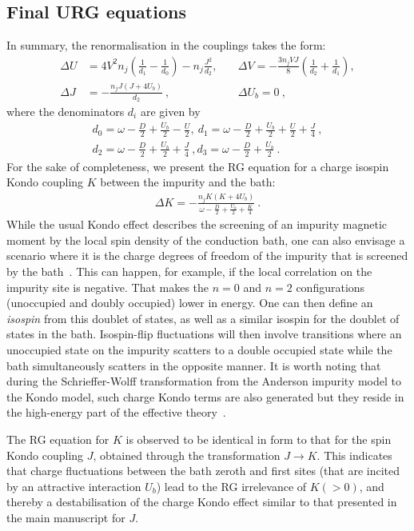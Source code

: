 \subsection{Final URG equations}
In summary, the renormalisation in the couplings takes the form:
\begin{eqnarray}
	\Delta U &= 4V^2 n_j\left(\frac{1}{d_1} - \frac{1}{d_0}\right) - n_j\frac{J^2}{d_2},\quad &\Delta V = -\frac{3n_j VJ}{8}\left(\frac{1}{d_2} + \frac{1}{d_1}\right),\nonumber \\
	\Delta J &= -\frac{n_j J\left(J + 4U_b\right)}{d_2}~,\quad &\Delta U_b = 0~,
\end{eqnarray}
where the denominators \(d_i\) are given by
\begin{eqnarray}
	d_0 = \omega - \frac{D}{2} + \frac{U_b}{2} - \frac{U}{2},~d_1 = \omega - \frac{D}{2} + \frac{U_b}{2} + \frac{U}{2} + \frac{J}{4}~,\\
	d_2 = \omega - \frac{D}{2} + \frac{U_b}{2} + \frac{J}{4}~,d_3 = \omega - \frac{D}{2} + \frac{U_b}{2}~.
\end{eqnarray}
For the sake of completeness, we present the RG equation for a charge isospin Kondo coupling $K$ between the impurity and the bath: 
\begin{eqnarray}
\Delta K = -\frac{n_j K\left(K + 4U_b\right)}{\omega - \frac{D}{2} + \frac{U_b}{2} + \frac{K}{4}}~.
\end{eqnarray}
{\color{\hicol} While the usual Kondo effect describes the screening of an impurity magnetic moment by the local spin density of the conduction bath, one can also envisage a scenario where it is the charge degrees of freedom of the impurity that is screened by the bath~\cite{taraphder1991}. This can happen, for example, if the local correlation on the impurity site is negative. That makes the \(n=0\) and \(n=2\) configurations (unoccupied and doubly occupied) lower in energy. One can then define an {\it isospin} from this doublet of states, as well as a similar isospin for the doublet of states in the bath. Isospin-flip fluctuations will then involve transitions where an unoccupied state on the impurity scatters to a double occupied state while the bath simultaneously scatters in the opposite manner. It is worth noting that during the Schrieffer-Wolff transformation from the Anderson impurity model to the Kondo model, such charge Kondo terms are also generated but they reside in the high-energy part of the effective theory~\cite{phillips2012advanced}.}

The RG equation for $K$ is observed to be identical in form to that for the spin Kondo coupling $J$, obtained through the transformation \(J \to K\). This indicates that charge fluctuations between the bath zeroth and first sites (that are incited by an attractive interaction $U_{b}$) lead to the RG irrelevance of $K (>0)$, and thereby a destabilisation of the charge Kondo effect similar to that presented in the main manuscript for $J$.


